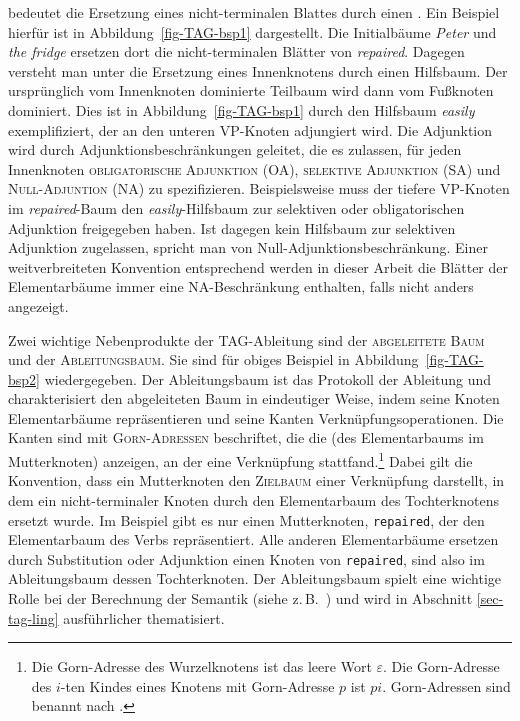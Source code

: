  bedeutet die Ersetzung eines nicht-terminalen Blattes durch einen . Ein Beispiel hierfür ist in Abbildung~\ref{fig-TAG-bsp1} dargestellt. Die Initialbäume {\it Peter} und {\it the fridge} ersetzen dort die nicht-terminalen Blätter von {\it repaired}. Dagegen versteht man unter  die Ersetzung eines Innenknotens durch einen Hilfsbaum. Der ursprünglich vom Innenknoten dominierte Teilbaum wird dann vom Fu\ss knoten dominiert. Dies ist in Abbildung~\ref{fig-TAG-bsp1} durch den Hilfsbaum {\it easily} exemplifiziert, der an den unteren VP-Knoten adjungiert wird. Die Adjunktion wird durch Adjunktionsbeschränkungen geleitet, die es zulassen, für jeden Innenknoten \textsc{obligatorische Adjunktion (OA)}, \textsc{selektive Adjunktion (SA)} und \textsc{Null-Adjuntion (NA)} zu spezifizieren. Beispielsweise muss der tiefere VP-Knoten im {\it repaired}-Baum den {\it easily}-Hilfsbaum zur selektiven oder obligatorischen Adjunktion freigegeben haben. Ist dagegen kein Hilfsbaum zur selektiven Adjunktion zugelassen, spricht man von Null-Adjunktionsbeschrän\-kung. Einer weitverbreiteten Konvention entsprechend werden in dieser Arbeit die Blätter der Elementarbäume immer eine NA-Beschränkung enthalten, falls nicht anders angezeigt.

Zwei wichtige Nebenprodukte der TAG-Ableitung sind der \textsc{abgeleitete Baum} und der \textsc{Ableitungsbaum}. Sie sind für obiges Beispiel in Abbildung~\ref{fig-TAG-bsp2} wiedergegeben. Der Ableitungsbaum ist das Protokoll der Ableitung und charakterisiert den abgeleiteten Baum in eindeutiger Weise, indem seine Knoten Elementarbäume repräsentieren und seine Kanten Verknüpfungsoperationen. Die Kanten sind mit \textsc{Gorn-Adressen} beschriftet, die die  (des Elementarbaums im Mutterknoten) anzeigen, an der eine Verknüpfung stattfand.\footnote{Die Gorn-Adresse des Wurzelknotens ist das leere Wort $\varepsilon$. Die Gorn-Adresse des $i$-ten Kindes eines Knotens mit Gorn-Adresse $p$ ist $pi$. Gorn-Adressen sind benannt nach \cite{Gorn:67}.} Dabei gilt die Konvention, dass ein Mutterknoten den \textsc{Zielbaum} einer Verknüpfung darstellt, in dem ein nicht-terminaler Knoten durch den Elementarbaum des Tochterknotens ersetzt wurde. Im Beispiel gibt es nur einen Mutterknoten, {\tt repaired}, der den Elementarbaum des Verbs repräsentiert. Alle anderen Elementarbäume ersetzen durch Substitution oder Adjunktion einen Knoten von {\tt repaired}, sind also im Ableitungsbaum dessen Tochterknoten. Der Ableitungsbaum spielt eine wichtige Rolle bei der Berechnung der Semantik (siehe z.\,B.\ \citealt{Kallmeyer:Joshi:03,Kallmeyer:Romero:08}) und wird in Abschnitt \ref{sec-tag-ling} ausführlicher thematisiert.

